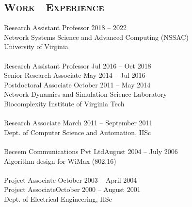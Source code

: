 \documentclass[margin,10pt]{res}
\begin{document}
\begin{resume}
\section{\textnormal{\textsc{Work\,\,\,\, Experience}}} 
Research Assistant Professor \hfill 2018 -- 2022\\
Network Systems Science and Advanced Computing (NSSAC)\\
University of Virginia\\
~~~\\
{Research Assistant Professor} \hfill Jul 2016 -- Oct 2018\\
Senior Research Associate \hfill May 2014 -- Jul 2016\\
Postdoctoral Associate \hfill October 2011 -- May 2014\\
Network Dynamics and Simulation Science Laboratory\\
Biocomplexity Institute of Virginia Tech\\
~~~\\
Research Associate \hfill March 2011 -- September 2011\\
Dept. of Computer Science and Automation, IISc \\
~~~\\
{Beceem Communications Pvt Ltd}\hfill August 2004 -- July 2006\\
Algorithm design for WiMax (802.16) \\
~~~\\
Project Associate \hfill October 2003 -- April 2004\\ 
Project Associate\hfill October 2000 -- August 2001\\ 
Dept. of Electrical Engineering, IISc \\


\end{resume}
\end{document}
